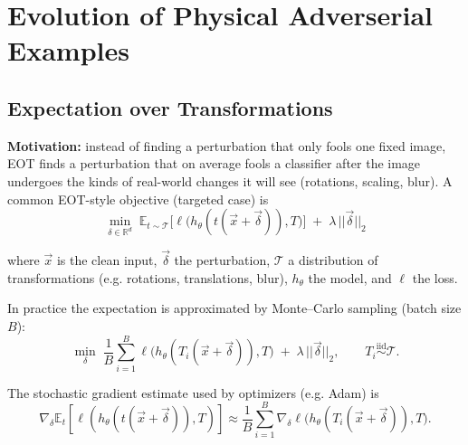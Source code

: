 \documentclass[11pt]{report}
\begin{document}

\maketitle



\section{Evolution of Physical Adverserial Examples}

\subsection{Expectation over Transformations}

\textbf{Motivation: }instead of finding a perturbation that only fools one fixed image, EOT finds a perturbation that on average fools a classifier after the image undergoes the kinds of real-world changes it will see (rotations, scaling, blur). A common EOT-style objective (targeted case) is
\begin{equation}\label{eq:eot-population}
\min_{\delta\in\mathbb{R}^d}\; 
\mathbb{E}_{t\sim\mathcal{T}}\Big[\ell\big(h_\theta(t(\vec{x}+\vec{\delta})), T\big)\Big]
\;+\; \lambda\, ||\vec{\delta}||_2
\end{equation}

\noindent where \(\vec{x}\) is the clean input, \(\vec{\delta}\) the perturbation, \(\mathcal{T}\) a distribution of transformations (e.g. rotations, translations, blur), \(h_\theta\) the model, and \(\ell\) the loss.

\medskip

\noindent In practice the expectation is approximated by Monte--Carlo sampling (batch size \(B\)):
\begin{equation}\label{eq:eot-mc}
\min_{\delta}\; \frac{1}{B}\sum_{i=1}^B
\ell\big(h_\theta(T_i(\vec{x}+\vec{\delta})), T\big)
\;+\; \lambda\, ||\vec{\delta}||_2, \qquad T_i\overset{\text{iid}}{\sim}\mathcal{T}.
\end{equation}

\noindent The stochastic gradient estimate used by optimizers (e.g. Adam) is
\begin{equation}\label{eq:eot-grad}
\nabla_\delta \mathbb{E}_{t}[\ell(h_\theta(t(\vec{x}+\vec{\delta})),T)]
\approx \frac{1}{B}\sum_{i=1}^B \nabla_\delta \ell\big(h_\theta(T_i(\vec{x}+\vec{\delta})), T\big).
\end{equation}
\end{document}
